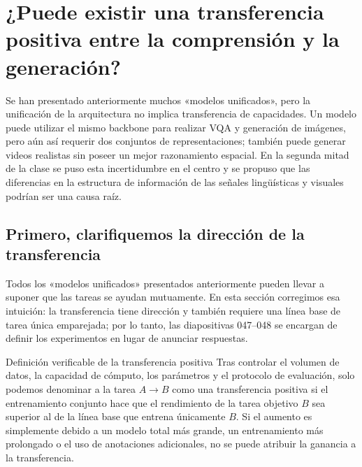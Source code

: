 \section{¿Puede existir una transferencia positiva entre la comprensión y la generación?}

Se han presentado anteriormente muchos «modelos unificados», pero la unificación de la arquitectura no implica transferencia de capacidades. Un modelo puede utilizar el mismo backbone para realizar VQA y generación de imágenes, pero aún así requerir dos conjuntos de representaciones; también puede generar videos realistas sin poseer un mejor razonamiento espacial. En la segunda mitad de la clase se puso esta incertidumbre en el centro y se propuso que las diferencias en la estructura de información de las señales lingüísticas y visuales podrían ser una causa raíz.

\subsection{Primero, clarifiquemos la dirección de la transferencia}

Todos los «modelos unificados» presentados anteriormente pueden llevar a suponer que las tareas se ayudan mutuamente. En esta sección corregimos esa intuición: la transferencia tiene dirección y también requiere una línea base de tarea única emparejada; por lo tanto, las diapositivas 047--048 se encargan de definir los experimentos en lugar de anunciar respuestas.


\begin{importantbox}{Definición verificable de la transferencia positiva}
Tras controlar el volumen de datos, la capacidad de cómputo, los parámetros y el protocolo de evaluación, solo podemos denominar a la tarea $A\rightarrow B$ como una transferencia positiva si el entrenamiento conjunto hace que el rendimiento de la tarea objetivo $B$ sea superior al de la línea base que entrena únicamente $B$. Si el aumento es simplemente debido a un modelo total más grande, un entrenamiento más prolongado o el uso de anotaciones adicionales, no se puede atribuir la ganancia a la transferencia.
\end{importantbox}


